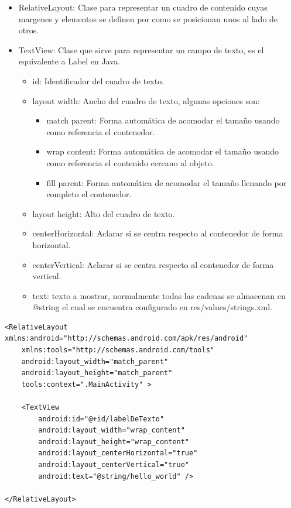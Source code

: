 \documentclass[11pt]{book}
\begin{document}
\begin{itemize}
\item RelativeLayout: Clase para representar un cuadro de contenido cuyas margenes y elementos se definen por como se posicionan unos al lado de otros.
\item TextView: Clase que sirve para representar un campo de texto, es el equivalente a Label en Java.
	\begin{itemize}
	\item id: Identificador del cuadro de texto.
	\item layout width: Ancho del cuadro de texto, algunas opciones son:
		\begin{itemize}
		\item match parent: Forma automática de acomodar el tamaño usando como referencia el contenedor.
		\item wrap content: Forma automática de acomodar el tamaño usando como referencia el contenido cercano al objeto.
		\item fill parent: Forma automática de acomodar el tamaño llenando por completo el contenedor.
		\end{itemize}
		\item layout height: Alto del cuadro de texto.
	\item centerHorizontal: Aclarar si se centra respecto al contenedor de forma horizontal.
	\item centerVertical: Aclarar si se centra respecto al contenedor de forma vertical.
	\item text: texto a mostrar, normalmente todas las cadenas se almacenan en @string el cual se encuentra configurado en res/values/strings.xml.
	\end{itemize}
\end{itemize}

\begin{lstlisting}
<RelativeLayout xmlns:android="http://schemas.android.com/apk/res/android"
    xmlns:tools="http://schemas.android.com/tools"
    android:layout_width="match_parent"
    android:layout_height="match_parent"
    tools:context=".MainActivity" >

    <TextView
        android:id="@+id/labelDeTexto"
        android:layout_width="wrap_content"
        android:layout_height="wrap_content"
        android:layout_centerHorizontal="true"
        android:layout_centerVertical="true"
        android:text="@string/hello_world" />

</RelativeLayout>
\end{lstlisting}
\end{document}
